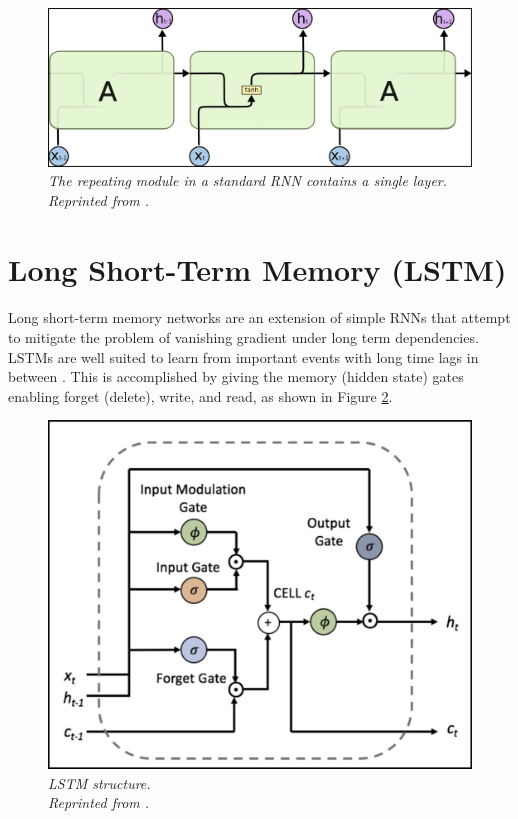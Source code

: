 \begin{figure}[H]
  \centering
  \caption[The repeating module in a standard RNN contains a single layer.]{\emph{The repeating module in a standard RNN contains a single layer. \\Reprinted from \citeauthor{olah_2015} \citeyear{olah_2015}.}}\label{fig:RNN_2}
  \includegraphics[scale = 0.2]{figures/RNN_2.jpg}  
\end{figure}

\section{Long Short-Term Memory (LSTM)}
\paragraph{}
Long short-term memory networks are an extension of simple RNNs that attempt to mitigate the problem of vanishing gradient under long term dependencies. LSTMs are well suited to learn from important events with long time lags in between \cite{donges_2019,olah_2015}. This is accomplished by giving the memory (hidden state) gates enabling forget (delete), write, and read, as shown in Figure \ref{fig:LSTM}.

\begin{figure}[H]
  \centering
  \caption[LSTM structure.]{\emph{LSTM structure. \\ Reprinted from  \citeauthor{sirinart_tangruamsub_2017} \citeyear{sirinart_tangruamsub_2017}.}}\label{fig:LSTM}
  \includegraphics[scale = 0.3]{figures/LSTM.jpg}  
\end{figure}

